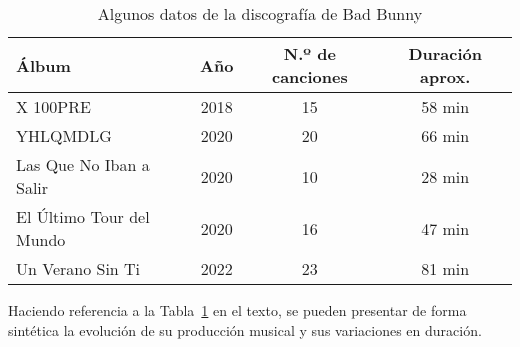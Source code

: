 \documentclass{article}
\begin{document}
\begin{table}[ht]
    \centering
    \begin{tabular}{l c c c}
    \hline
    \textbf{Álbum} & \textbf{Año} & \textbf{N.º de canciones} & \textbf{Duración aprox.} \\
    \hline
    X 100PRE & 2018 & 15 & 58 min \\
    YHLQMDLG & 2020 & 20 & 66 min \\
    Las Que No Iban a Salir & 2020 & 10 & 28 min \\
    El Último Tour del Mundo & 2020 & 16 & 47 min \\
    Un Verano Sin Ti & 2022 & 23 & 81 min \\
    \hline
    \end{tabular}
    \caption{Algunos datos de la discografía de Bad Bunny}
    \label{tab:BadBunny}
\end{table}

Haciendo referencia a la Tabla~\ref{tab:BadBunny} en el texto, se pueden
presentar de forma sintética la evolución de su producción musical y 
sus variaciones en duración.
\end{document}
